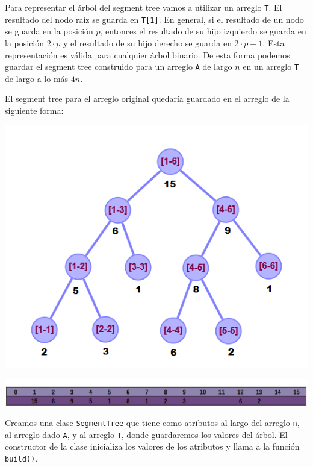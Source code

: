 Para representar el \'arbol del segment tree vamos a utilizar un arreglo \texttt{T}. El resultado del nodo ra\'iz se guarda en \texttt{T[1]}. En general, si el resultado de un nodo se guarda en la posici\'on $p$, entonces el resultado de su hijo izquierdo se guarda en la posici\'on $2 \cdot p$ y el resultado de su hijo derecho se guarda en $2 \cdot p + 1$. Esta representaci\'on es v\'alida para cualquier \'arbol binario. De esta forma podemos guardar el segment tree construido para un arreglo \texttt{A} de largo $n$ en un arreglo \texttt{T} de largo a lo m\'as $4n$. 

El segment tree para el arreglo original quedar\'ia guardado en el arreglo de la siguiente forma:

\begin{minipage}{\columnwidth}
    \includegraphics[width=\linewidth]{imag/segment_tree_suma}
    \label{example_st_casos}
\end{minipage}

\noindent \begin{minipage}{\linewidth}
    \includegraphics[width=\linewidth]{imag/arreglo2}
    \label{example_st_casos}
\end{minipage}

Creamos una clase \texttt{SegmentTree} que tiene como atributos al largo del arreglo \texttt{n}, al arreglo dado \texttt{A}, y al arreglo \texttt{T}, donde guardaremos los valores del \'arbol. El constructor de la clase inicializa los valores de los atributos y llama a la funci\'on \texttt{build()}.

